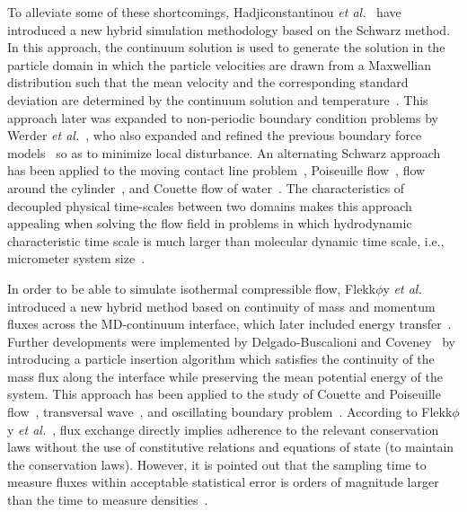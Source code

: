\documentclass[preprint,12pt]{elsarticle}
\begin{document}
To alleviate some of these shortcomings, Hadjiconstantinou {\it{et al.}}~\cite{Hadjicon1,Hadjicon2,Hadjicon3} 
have introduced a new hybrid simulation methodology based on the Schwarz method. In this approach, the continuum solution is used to generate the solution in the particle domain in which the particle velocities are drawn from a Maxwellian distribution such that the mean velocity and the corresponding standard deviation are determined by the continuum solution and temperature~\cite{Hadjicon2}. This approach later was expanded to non-periodic boundary condition problems by Werder {\it{et al.}}~\cite{Werder}, who also expanded and refined the previous boundary force models~\cite{Thompson,Flekkoy,Delgado1,Nie} so as to minimize local disturbance. 
An alternating Schwarz approach has been applied to the moving contact line problem~\cite{Hadjicon2}, Poiseuille flow~\cite{Hadjicon3}, flow around the cylinder~\cite{Werder}, and Couette flow of water~\cite{Kotsalis}. The characteristics of decoupled physical time-scales between two domains makes this approach appealing when solving the flow field in problems in which hydrodynamic characteristic time scale is much larger than molecular dynamic time scale, i.e., micrometer system size~\cite{Hadjicon2}. 


In order to be able to simulate isothermal compressible flow, Flekk$\phi$y {\it{et al.}}~\cite{Flekkoy} introduced a new hybrid method based on continuity of mass and momentum fluxes across the MD-continuum interface, which later included energy transfer~\cite{Wagner,Delgado1}. Further developments were implemented by Delgado-Buscalioni and Coveney~\cite{USHER} by introducing a particle insertion algorithm which satisfies the continuity of the mass flux along the interface while preserving the mean potential energy of the system. This approach has been applied to the study of Couette and Poiseuille flow~\cite{Flekkoy}, transversal wave~\cite{Delgado1}, and oscillating boundary problem~\cite{Time_Mechanism}. According to Flekk$\phi$y {\it{et al.}}~\cite{Flekkoy}, flux exchange directly implies adherence to the relevant conservation laws without the use of constitutive relations and equations of state (to maintain the conservation laws). However, it is pointed out that the sampling time to measure fluxes within acceptable statistical error is orders of magnitude larger than the time to measure densities~\cite{Hadjicon3}.
\end{document}
